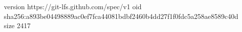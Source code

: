 version https://git-lfs.github.com/spec/v1
oid sha256:a893be04498889ac0ef7fca44081bdbf2460b4dd27f1f0fdc5a258ae8589c40d
size 2417
